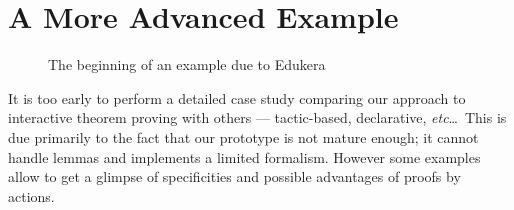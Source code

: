 





\section{A More Advanced Example}
\begin{figure*}
\caption{The beginning of an example due to Edukera}
\end{figure*}

It is too early to perform a detailed case study comparing our approach
to interactive theorem proving with others --- tactic-based,
declarative, {\em etc}\dots~This is due primarily to the fact that
our prototype is not mature enough; it cannot handle lemmas and
implements a limited formalism. However some examples allow to get a
glimpse of specificities and possible advantages of proofs by actions.

